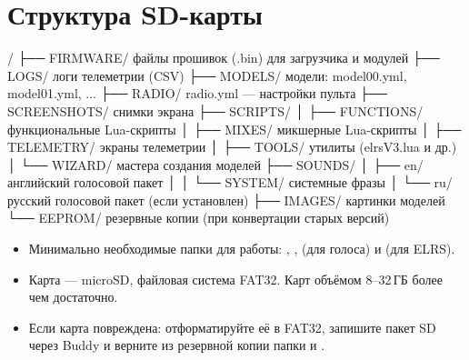 \chapter{Структура SD-карты}
\label{app:sd}

\begin{Code}[numbers=none]
/
├── FIRMWARE/        файлы прошивок (.bin) для загрузчика и модулей
├── LOGS/            логи телеметрии (CSV)
├── MODELS/          модели: model00.yml, model01.yml, ...
├── RADIO/           radio.yml — настройки пульта
├── SCREENSHOTS/     снимки экрана
├── SCRIPTS/
│   ├── FUNCTIONS/   функциональные Lua-скрипты
│   ├── MIXES/       микшерные Lua-скрипты
│   ├── TELEMETRY/   экраны телеметрии
│   ├── TOOLS/       утилиты (elrsV3.lua и др.)
│   └── WIZARD/      мастера создания моделей
├── SOUNDS/
│   ├── en/          английский голосовой пакет
│   │   └── SYSTEM/  системные фразы
│   └── ru/          русский голосовой пакет (если установлен)
├── IMAGES/          картинки моделей
└── EEPROM/          резервные копии (при конвертации старых версий)
\end{Code}

\begin{itemize}
  \item Минимально необходимые папки для работы: , ,
         (для голоса) и  (для ELRS).
  \item Карта --- microSD, файловая система FAT32. Карт объёмом 8--32\,ГБ более чем достаточно.
  \item Если карта повреждена: отформатируйте её в FAT32, запишите пакет SD через Buddy и
        верните из резервной копии папки  и .
\end{itemize}
